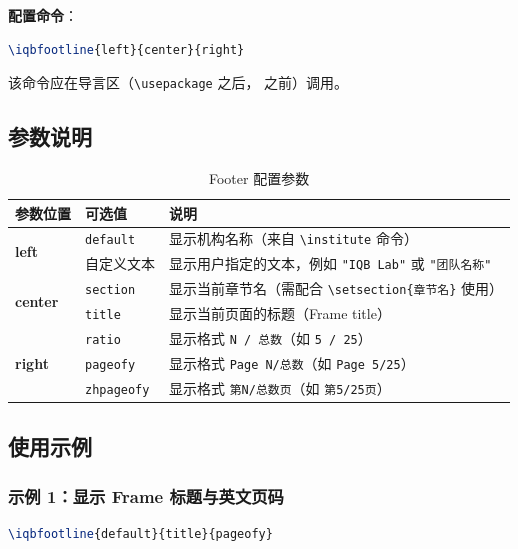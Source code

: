 \textbf{配置命令}：

\begin{lstlisting}[style=blockstyle,language=TeX]
\iqbfootline{left}{center}{right}
\end{lstlisting}

该命令应在导言区（\lstinline|\usepackage| 之后，\lstinline|| 之前）调用。

\subsection{参数说明}

\begin{table}[!h]
\centering
\caption{Footer 配置参数}
\label{tab:footer-params}
\begin{tabular}{p{2cm}p{3.5cm}p{7cm}}
\toprule
\textbf{参数位置} & \textbf{可选值} & \textbf{说明} \\
\midrule
\multirow{2}{*}{\textbf{left}} & \lstinline|default| & 显示机构名称（来自 \lstinline|\institute| 命令） \\
& 自定义文本 & 显示用户指定的文本，例如 \lstinline|"IQB Lab"| 或 \lstinline|"团队名称"| \\
\midrule
\multirow{2}{*}{\textbf{center}} & \lstinline|section| & 显示当前章节名（需配合 \lstinline|\setsection{章节名}| 使用） \\
& \lstinline|title| & 显示当前页面的标题（Frame title） \\
\midrule
\multirow{3}{*}{\textbf{right}} & \lstinline|ratio| & 显示格式 \lstinline|N / 总数|（如 \lstinline|5 / 25|） \\
& \lstinline|pageofy| & 显示格式 \lstinline|Page N/总数|（如 \lstinline|Page 5/25|） \\
& \lstinline|zhpageofy| & 显示格式 \lstinline|第N/总数页|（如 \lstinline|第5/25页|） \\
\bottomrule
\end{tabular}
\end{table}

\subsection{使用示例}

\subsubsection{示例 1：显示 Frame 标题与英文页码}

\begin{lstlisting}[style=blockstyle,language=TeX]
\iqbfootline{default}{title}{pageofy}
\end{lstlisting}

